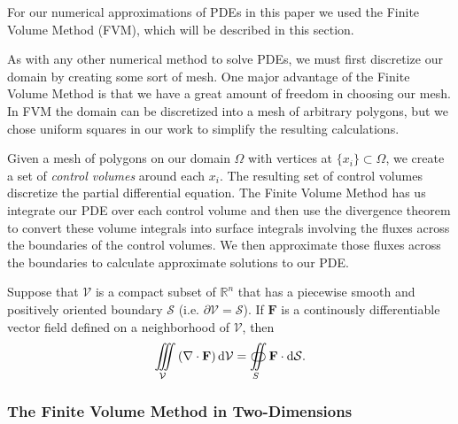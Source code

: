 For our numerical approximations of PDEs in this paper we used the Finite Volume Method (FVM), which will be described in this section.

As with any other numerical method to solve PDEs, we must first discretize our domain by creating some sort of mesh. One major advantage of the Finite Volume Method is that we have a great amount of freedom in choosing our mesh. In FVM the domain can be discretized into a mesh of arbitrary polygons, but we chose uniform squares in our work to simplify the resulting calculations.

Given a mesh of polygons on our domain $\Omega$ with vertices at $\lbrace x_i\rbrace\subset\Omega$, we create a set of {\color{baystate}\textit{control volumes}} around each $x_i$. The resulting set of control volumes discretize the partial differential equation. The Finite Volume Method has us integrate our PDE over each control volume and then use the divergence theorem to convert these volume integrals into surface integrals involving the fluxes across the boundaries of the control volumes. We then approximate those fluxes across the boundaries to calculate approximate solutions to our PDE.

\begin{thm}
	Suppose that $\mathcal{V}$ is a compact subset of $\mathbb{R}^n$ that has a piecewise smooth and positively oriented boundary $\mathcal{S}$ (i.e. $\partial\mathcal{V}=\mathcal{S}$). If $\mathbf{F}$ is a continously differentiable vector field defined on a neighborhood of $\mathcal{V}$, then
	\begin{equation}
		\iiint\limits_{\mathcal{V}}\left(\nabla\cdot\mathbf{F}\right)\dif\mathcal{V}=\oiint\limits_S\mathbf{F}\cdot\dif\mathcal{S}.\label{eqn:div-thm}
	\end{equation}
	\label{thm:div-thm}
\end{thm}

\subsubsection{The Finite Volume Method in Two-Dimensions}


